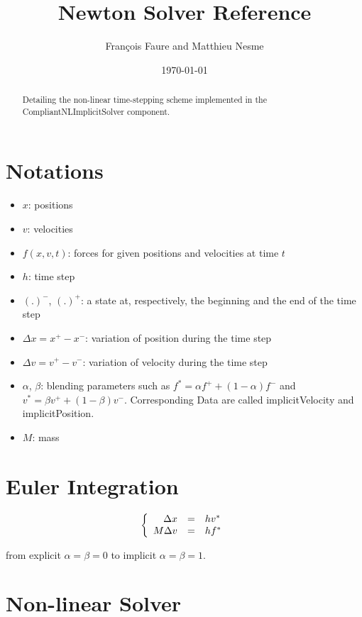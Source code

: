 \documentclass{article}
\newcommand{\p}[1]{#1^{+}}
\newcommand{\m}[1]{#1^{-}}
\newcommand{\s}[1]{#1^{*}}
\newcommand{\xp}{\p{x}}
\newcommand{\xm}{\m{x}}
\newcommand{\vp}{\p{v}}
\newcommand{\vm}{\m{v}}
\newcommand{\vs}{\s{v}}
\newcommand{\fp}{\p{f}}
\newcommand{\fm}{\m{f}}
\newcommand{\fs}{\s{f}}
\newcommand{\Dx}{\Delta x}
\newcommand{\Dv}{\Delta v}
\begin{document}
\title{Newton Solver Reference}
\author{Fran\c{c}ois Faure and Matthieu Nesme}
\date{\today}
\maketitle
%
\begin{abstract}
  Detailing the non-linear time-stepping scheme implemented in the CompliantNLImplicitSolver component.
\end{abstract}
%


\section{Notations}


\begin{itemize}
\item $x$: positions
\item $v$: velocities
\item $f(x,v,t)$: forces for given positions and velocities at time $t$
\item $h$: time step
\item $\m{(.)}$, $\p{(.)}$: a state at, respectively, the beginning and the end of the time step
\item $\Dx=\xp-\xm$: variation of position during the time step
\item $\Dv=\vp-\vm$: variation of velocity during the time step
\item $\alpha$, $\beta$: blending parameters such as $\fs=\alpha\fp+(1-\alpha)\fm$ and $\vs=\beta\vp+(1-\beta)\vm$. Corresponding Data are called implicitVelocity and implicitPosition.
\item $M$: mass
\end{itemize}

\section{Euler Integration}

\[
   \left \{
   \begin{array}{r c l}
      \Dx  & = & h\vs \\
      M\Dv & = & h\fs \\
   \end{array}
   \right .
\]

from explicit $\alpha=\beta=0$ to implicit $\alpha=\beta=1$.


\section{Non-linear Solver}
\end{document}
